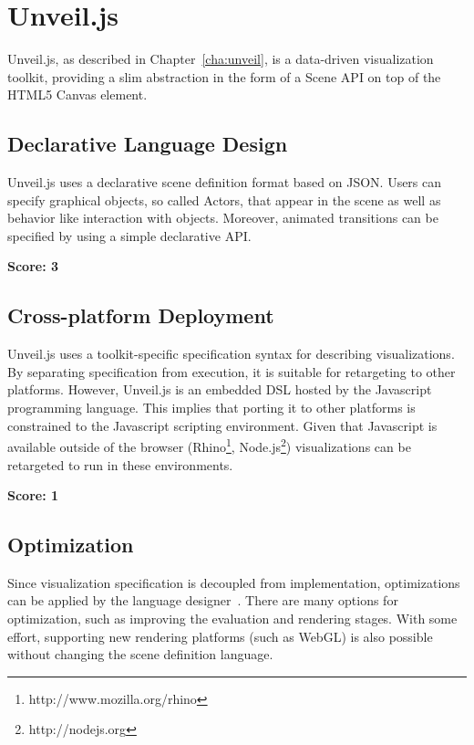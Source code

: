 \section{Unveil.js}

Unveil.js, as described in Chapter~\ref{cha:unveil}, is a data-driven visualization toolkit, providing a slim abstraction in the form of a Scene API on top of the HTML5 Canvas element.

\subsection{Declarative Language Design}

Unveil.js uses a declarative scene definition format based on JSON. Users can specify graphical objects, so called Actors, that appear in the scene as well as behavior like interaction with objects. Moreover, animated transitions can be specified by using a simple declarative API.

\SuperPar \textbf{Score: 3}

\subsection{Cross-platform Deployment}

Unveil.js uses a toolkit-specific specification syntax for describing visualizations. By separating specification from execution, it is suitable for retargeting to other platforms. However, Unveil.js is an embedded DSL hosted by the Javascript programming language. This implies that porting it to other platforms is constrained to the Javascript scripting environment. Given that Javascript is available outside of the browser (Rhino\footnote{http://www.mozilla.org/rhino}, Node.js\footnote{http://nodejs.org}) visualizations can be retargeted to run in these environments.


\SuperPar \textbf{Score: 1}


\subsection{Optimization}

Since visualization specification is decoupled from implementation, optimizations can be applied by the language designer~\cite{DeclarativeLD10}. There are many options for optimization, such as improving the evaluation and rendering stages. With some effort, supporting new rendering platforms (such as WebGL) is also possible without changing the scene definition language.

